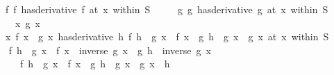 \begin{isabellebody}
\ \ \ f{\isacharcolon}{\kern0pt}\ {\isachardoublequoteopen}{\isacharparenleft}{\kern0pt}f\ has{\isacharunderscore}{\kern0pt}derivative\ f{\isacharprime}{\kern0pt}{\isacharparenright}{\kern0pt}\ {\isacharparenleft}{\kern0pt}at\ x\ within\ S{\isacharparenright}{\kern0pt}{\isachardoublequoteclose}\isanewline
\ \ \ \ \ g{\isacharcolon}{\kern0pt}\ {\isachardoublequoteopen}{\isacharparenleft}{\kern0pt}g\ has{\isacharunderscore}{\kern0pt}derivative\ g{\isacharprime}{\kern0pt}{\isacharparenright}{\kern0pt}\ {\isacharparenleft}{\kern0pt}at\ x\ within\ S{\isacharparenright}{\kern0pt}{\isachardoublequoteclose}\isanewline
\ \ \ \ \ x{\isacharcolon}{\kern0pt}\ {\isachardoublequoteopen}g\ x\ {\isasymnoteq}\ {}{\isachardoublequoteclose}\isanewline
\ \ \ {\isachardoublequoteopen}{\isacharparenleft}{\kern0pt}{\isacharparenleft}{\kern0pt}{\isasymlambda}x{\isachardot}{\kern0pt}\ f\ x\ {\isacharslash}{\kern0pt}\ g\ x{\isacharparenright}{\kern0pt}\ has{\isacharunderscore}{\kern0pt}derivative\ {\isacharparenleft}{\kern0pt}{\isasymlambda}h{\isachardot}{\kern0pt}\ {\isacharparenleft}{\kern0pt}f{\isacharprime}{\kern0pt}\ h\ {\isacharasterisk}{\kern0pt}\ g\ x\ {\isacharminus}{\kern0pt}\ f\ x\ {\isacharasterisk}{\kern0pt}\ g{\isacharprime}{\kern0pt}\ h{\isacharparenright}{\kern0pt}\ {\isacharslash}{\kern0pt}\ {\isacharparenleft}{\kern0pt}g\ x\ {\isacharasterisk}{\kern0pt}\ g\ x{\isacharparenright}{\kern0pt}{\isacharparenright}{\kern0pt}{\isacharparenright}{\kern0pt}\ {\isacharparenleft}{\kern0pt}at\ x\ within\ S{\isacharparenright}{\kern0pt}{\isachardoublequoteclose}\isanewline
%
\isadelimproof
%
\endisadelimproof
%
\isatagproof
{}\isamarkupfalse%
\ {\isacharminus}{\kern0pt}\isanewline
\ \ \isamarkupfalse%
\ {\isachardoublequoteopen}f{\isacharprime}{\kern0pt}\ h\ {\isacharslash}{\kern0pt}\ g\ x\ {\isacharminus}{\kern0pt}\ f\ x\ {\isacharasterisk}{\kern0pt}\ {\isacharparenleft}{\kern0pt}inverse\ {\isacharparenleft}{\kern0pt}g\ x{\isacharparenright}{\kern0pt}\ {\isacharasterisk}{\kern0pt}\ g{\isacharprime}{\kern0pt}\ h\ {\isacharasterisk}{\kern0pt}\ inverse\ {\isacharparenleft}{\kern0pt}g\ x{\isacharparenright}{\kern0pt}{\isacharparenright}{\kern0pt}\ {\isacharequal}{\kern0pt}\isanewline
\ \ \ \ \ \ {\isacharparenleft}{\kern0pt}f{\isacharprime}{\kern0pt}\ h\ {\isacharasterisk}{\kern0pt}\ g\ x\ {\isacharminus}{\kern0pt}\ f\ x\ {\isacharasterisk}{\kern0pt}\ g{\isacharprime}{\kern0pt}\ h{\isacharparenright}{\kern0pt}\ {\isacharslash}{\kern0pt}\ {\isacharparenleft}{\kern0pt}g\ x\ {\isacharasterisk}{\kern0pt}\ g\ x{\isacharparenright}{\kern0pt}{\isachardoublequoteclose}\ \ h\isanewline

\end{isabellebody}
